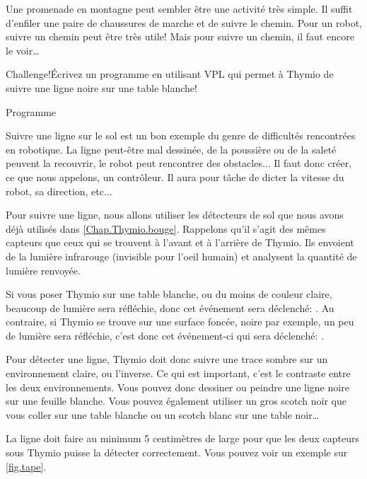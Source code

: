 \label{ch.line}

Une promenade en montagne  peut sembler être une activité très simple. Il suffit d'enfiler une paire de chaussures de marche et de suivre le chemin. Pour un robot, suivre un chemin peut être très utile! Mais pour suivre un chemin, il faut encore le voir\ldots

\begin{bclogo}[couleur = pink!30, arrondi = 0.1, logo = \bccrayon, ombre = true]{Challenge!}Écrivez un programme en utilisant VPL qui permet à Thymio de suivre une ligne noire sur une table blanche!
\end{bclogo}

{\raggedleft \hfill Programme }

Suivre une ligne sur le sol est un bon exemple du genre de difficultés rencontrées en robotique. La ligne peut-être mal dessinée, de la poussière ou de la saleté peuvent la recouvrir, le robot peut rencontrer des obstacles... Il faut donc créer, ce que nous appelons,  un contrôleur. Il aura pour tâche de dicter la vitesse du robot, sa direction, etc...


Pour suivre une ligne, nous allons utiliser les détecteurs de sol que nous avons déjà utilisés dans \cref{Chap.Thymio.bouge}. Rappelons qu'il s'agit des mêmes capteurs que ceux qui se trouvent à l'avant et à l'arrière de Thymio. Ils envoient de la lumière infrarouge (invisible pour l'oeil humain) et analysent la quantité de lumière renvoyée.

Si vous poser Thymio sur une table blanche, ou du moins de couleur claire, beaucoup de lumière sera réfléchie, donc cet événement sera déclenché: . Au contraire, si Thymio se trouve sur une surface foncée, noire par exemple, un peu de lumière sera réfléchie, c'est donc cet événement-ci qui sera déclenché: .

Pour détecter une ligne, Thymio doit donc suivre une trace sombre sur un environnement claire, ou l'inverse. Ce qui est important, c'est le contraste entre les deux environnements. Vous pouvez donc dessiner ou peindre une ligne noire sur une feuille blanche. Vous pouvez également utiliser un gros scotch noir que vous coller sur une table blanche ou un scotch blanc sur une table noir\ldots 

La ligne doit faire au minimum 5 centimètres de large pour que les deux capteurs sous Thymio puisse la détecter correctement. Vous pouvez voir un exemple sur \cref{fig.tape}.

